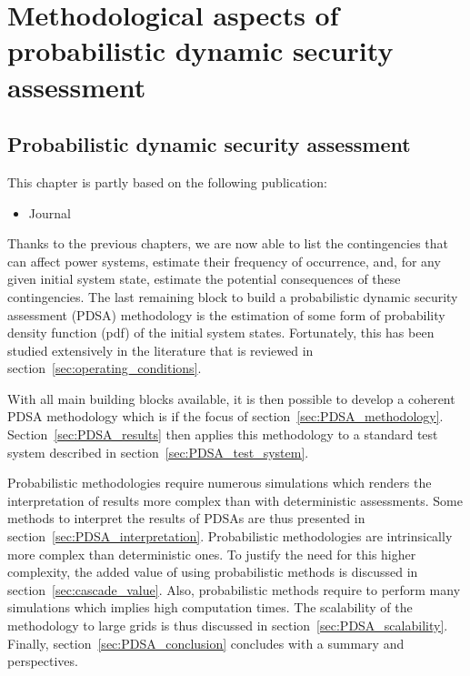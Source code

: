 \part{Methodological aspects of probabilistic dynamic security assessment}
\label{part:PDSA}
\chapter{Probabilistic dynamic security assessment}
\label{ch:DPSA}
\minitoc

\begin{tcolorbox}[width=\linewidth, sharp corners=all,
    colback=white!80!black,
    colframe=white!80!black]
This chapter is partly based on the following publication:
\begin{itemize}
    \item Journal
\end{itemize}
\end{tcolorbox}

Thanks to the previous chapters, we are now able to list the contingencies that can affect power systems, estimate their frequency of occurrence, and, for any given initial system state, estimate the potential consequences of these contingencies. The last remaining block to build a probabilistic dynamic security assessment (PDSA) methodology is the estimation of some form of probability density function (pdf) of the initial system states. Fortunately, this has been studied extensively in the literature that is reviewed in section~\ref{sec:operating_conditions}.

With all main building blocks available, it is then possible to develop a coherent PDSA methodology which is if the focus of section~\ref{sec:PDSA_methodology}. Section~\ref{sec:PDSA_results} then applies this methodology to a standard test system described in section~\ref{sec:PDSA_test_system}.

Probabilistic methodologies require numerous simulations which renders the interpretation of results more complex than with deterministic assessments. Some methods to interpret the results of PDSAs are thus presented in section~\ref{sec:PDSA_interpretation}. Probabilistic methodologies are intrinsically more complex than deterministic ones. To justify the need for this higher complexity, the added value of using probabilistic methods is discussed in section~\ref{sec:cascade_value}. Also, probabilistic methods require to perform many simulations which implies high computation times. The scalability of the methodology to large grids is thus discussed in section~\ref{sec:PDSA_scalability}. Finally, section~\ref{sec:PDSA_conclusion} concludes with a summary and perspectives.

